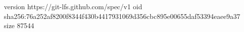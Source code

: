 version https://git-lfs.github.com/spec/v1
oid sha256:76a252af8200f8344f430b4417931069d356cbc895e00655daf53394eaee9a37
size 87544
